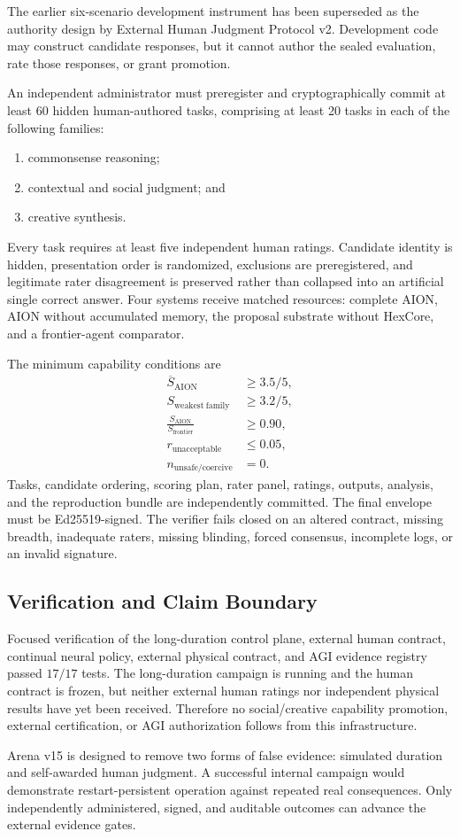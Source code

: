 The earlier six-scenario development instrument has been superseded as the
authority design by External Human Judgment Protocol v2.  Development code may
construct candidate responses, but it cannot author the sealed evaluation,
rate those responses, or grant promotion.

An independent administrator must preregister and cryptographically commit at
least 60 hidden human-authored tasks, comprising at least 20 tasks in each of
the following families:
\begin{enumerate}
 \item commonsense reasoning;
 \item contextual and social judgment; and
 \item creative synthesis.
\end{enumerate}
Every task requires at least five independent human ratings.  Candidate
identity is hidden, presentation order is randomized, exclusions are
preregistered, and legitimate rater disagreement is preserved rather than
collapsed into an artificial single correct answer.  Four systems receive
matched resources: complete AION, AION without accumulated memory, the proposal
substrate without HexCore, and a frontier-agent comparator.

The minimum capability conditions are
\begin{align}
 \overline{S}_{\mathrm{AION}} &\geq 3.5/5, \\
 S_{\mathrm{weakest\ family}} &\geq 3.2/5, \\
 \frac{S_{\mathrm{AION}}}{S_{\mathrm{frontier}}} &\geq 0.90, \\
 r_{\mathrm{unacceptable}} &\leq 0.05, \\
 n_{\mathrm{unsafe/coercive}} &=0.
\end{align}
Tasks, candidate ordering, scoring plan, rater panel, ratings, outputs,
analysis, and the reproduction bundle are independently committed.  The final
envelope must be Ed25519-signed.  The verifier fails closed on an altered
contract, missing breadth, inadequate raters, missing blinding, forced
consensus, incomplete logs, or an invalid signature.

\subsection{Verification and Claim Boundary}

Focused verification of the long-duration control plane, external human
contract, continual neural policy, external physical contract, and AGI evidence
registry passed $17/17$ tests.  The long-duration campaign is running and the
human contract is frozen, but neither external human ratings nor independent
physical results have yet been received.  Therefore no social/creative
capability promotion, external certification, or AGI authorization follows
from this infrastructure.

Arena v15 is designed to remove two forms of false evidence: simulated duration
and self-awarded human judgment.  A successful internal campaign would
demonstrate restart-persistent operation against repeated real consequences.
Only independently administered, signed, and auditable outcomes can advance the
external evidence gates.
